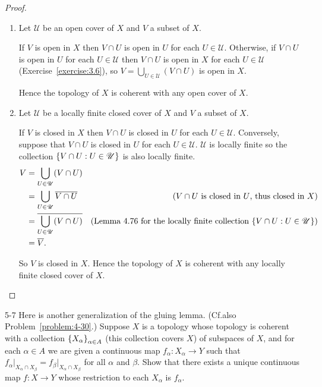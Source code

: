 \begin{proof}
	\begin{enumerate}[label={(\alph*)}]
		\item Let \( \mathscr{U} \) be an open cover of \( X \) and \( V \) a subset of \( X \).

		      If \( V \) is open in \( X \) then \( V\cap U \) is open in \( U \) for each \( U\in\mathscr{U} \). Otherwise, if \( V\cap U \) is open in \( U \) for each \( U\in\mathscr{U} \) then \( V\cap U \) is open in \( X \) for each \( U\in\mathscr{U} \) (Exercise~\ref{exercise:3.6}), so \( V = \bigcup_{U\in\mathscr{U}}(V\cap U) \) is open in \( X \).

		      Hence the topology of \( X \) is coherent with any open cover of \( X \).
		\item Let \( \mathscr{U} \) be a locally finite closed cover of \( X \) and \( V \) a subset of \( X \).

		      If \( V \) is closed in \( X \) then \( V\cap U \) is closed in \( U \) for each \( U\in\mathscr{U} \). Conversely, suppose that \( V\cap U \) is closed in \( U \) for each \( U\in\mathscr{U} \). \( \mathscr{U} \) is locally finite so the collection \( \left\{{ V\cap U : U\in\mathscr{U} }\right\} \) is also locally finite.
		      \begin{align*}
			      V & = \bigcup_{U\in\mathscr{U}} (V\cap U)                                                                                                        \\
			        & = \bigcup_{U\in\mathscr{U}} \overline{V\cap U}   & \text{(\(  V\cap U  \) is closed in \(  U  \), thus closed in \(  X  \))}                                   \\
			        & = \overline{\bigcup_{U\in\mathscr{U}} (V\cap U)} & \text{(Lemma 4.76 for the locally finite collection \(  \left\{{ V\cap U : U\in\mathscr{U} }\right\}  \))} \\
			        & = \overline{V}.
		      \end{align*}

		      So \( V \) is closed in \( X \). Hence the topology of \( X \) is coherent with any locally finite closed cover of \( X \).
	\end{enumerate}
\end{proof}

\begin{problem}{5-7}\label{problem:5-7}
Here is another generalization of the gluing lemma. (Cf.\@ also Problem~\ref{problem:4-30}.) Suppose \( X \) is a topology whose topology is coherent with a collection \( \left\{{X_{\alpha}}\right\}_{\alpha\in A} \) (this collection covers \( X \)) of subspaces of \( X \), and for each \( \alpha\in A \) we are given a continuous map \( f_{\alpha}: X_{\alpha} \to Y \) such that \( f_{\alpha}\vert_{X_{\alpha} \cap X_{\beta}} = f_{\beta}\vert_{X_{\alpha} \cap X_{\beta}} \) for all \( \alpha \) and \( \beta \). Show that there exists a unique continuous map \( f: X \to Y \) whose restriction to each \( X_{\alpha} \) is \( f_{\alpha} \).
\end{problem}

